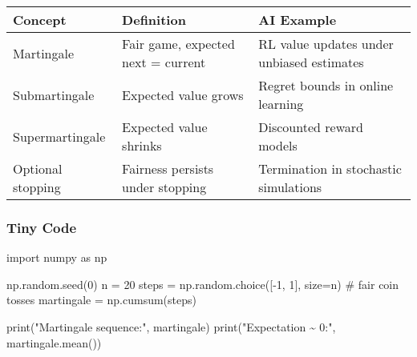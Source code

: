 \documentclass[
  letterpaper,
  DIV=11,
  numbers=noendperiod]{scrreprt}
\newenvironment{Shaded}{\begin{snugshade}}{\end{snugshade}}
\newcommand{\BuiltInTok}[1]{\textcolor[rgb]{0.00,0.23,0.31}{#1}}
\newcommand{\CommentTok}[1]{\textcolor[rgb]{0.37,0.37,0.37}{#1}}
\newcommand{\DecValTok}[1]{\textcolor[rgb]{0.68,0.00,0.00}{#1}}
\newcommand{\ImportTok}[1]{\textcolor[rgb]{0.00,0.46,0.62}{#1}}
\newcommand{\NormalTok}[1]{\textcolor[rgb]{0.00,0.23,0.31}{#1}}
\newcommand{\OperatorTok}[1]{\textcolor[rgb]{0.37,0.37,0.37}{#1}}
\newcommand{\StringTok}[1]{\textcolor[rgb]{0.13,0.47,0.30}{#1}}
\begin{document}
\begin{longtable}[]{@{}
  >{\raggedright\arraybackslash}p{}
  >{\raggedright\arraybackslash}p{}
  >{\raggedright\arraybackslash}p{}@{}}
\toprule\noalign{}
\begin{minipage}[b]{\linewidth}\raggedright
Concept
\end{minipage} & \begin{minipage}[b]{\linewidth}\raggedright
Definition
\end{minipage} & \begin{minipage}[b]{\linewidth}\raggedright
AI Example
\end{minipage} \\
\midrule\noalign{}
\endhead
\bottomrule\noalign{}
\endlastfoot
Martingale & Fair game, expected next = current & RL value updates under
unbiased estimates \\
Submartingale & Expected value grows & Regret bounds in online
learning \\
Supermartingale & Expected value shrinks & Discounted reward models \\
Optional stopping & Fairness persists under stopping & Termination in
stochastic simulations \\
\end{longtable}

\subsubsection{Tiny Code}\label{tiny-code-177}

\begin{Shaded}
\begin{Highlighting}[]
\ImportTok{import}\NormalTok{ numpy }\ImportTok{as}\NormalTok{ np}

\NormalTok{np.random.seed(}\DecValTok{0}\NormalTok{)}
\NormalTok{n }\OperatorTok{=} \DecValTok{20}
\NormalTok{steps }\OperatorTok{=}\NormalTok{ np.random.choice([}\OperatorTok{{-}}\DecValTok{1}\NormalTok{, }\DecValTok{1}\NormalTok{], size}\OperatorTok{=}\NormalTok{n)  }\CommentTok{\# fair coin tosses}
\NormalTok{martingale }\OperatorTok{=}\NormalTok{ np.cumsum(steps)}

\BuiltInTok{print}\NormalTok{(}\StringTok{"Martingale sequence:"}\NormalTok{, martingale)}
\BuiltInTok{print}\NormalTok{(}\StringTok{"Expectation \textasciitilde{} 0:"}\NormalTok{, martingale.mean())}
\end{Highlighting}
\end{Shaded}
\end{document}

